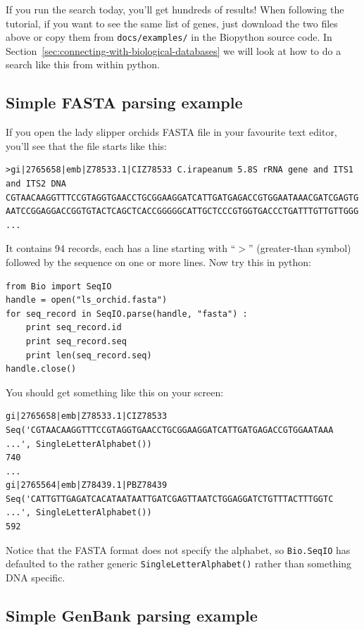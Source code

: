 \documentclass{report}
\begin{document}
If you run the search today, you'll get hundreds of results!  When following the tutorial, if you want to see the same list of genes, just download the two files above or copy them from \verb|docs/examples/| in the Biopython source code.  In Section~\ref{sec:connecting-with-biological-databases} we will look at how to do a search like this from within python.

\subsection{Simple FASTA parsing example}
\label{sec:fasta-parsing}

If you open the lady slipper orchids FASTA file in your favourite text editor, you'll see that the file starts like this:

\begin{verbatim}
>gi|2765658|emb|Z78533.1|CIZ78533 C.irapeanum 5.8S rRNA gene and ITS1 and ITS2 DNA
CGTAACAAGGTTTCCGTAGGTGAACCTGCGGAAGGATCATTGATGAGACCGTGGAATAAACGATCGAGTG
AATCCGGAGGACCGGTGTACTCAGCTCACCGGGGGCATTGCTCCCGTGGTGACCCTGATTTGTTGTTGGG
...
\end{verbatim}

It contains 94 records, each has a line starting with ``$>$'' (greater-than symbol) followed by the sequence on one or more lines.  Now try this in python:

\begin{verbatim}
from Bio import SeqIO
handle = open("ls_orchid.fasta")
for seq_record in SeqIO.parse(handle, "fasta") :
    print seq_record.id
    print seq_record.seq
    print len(seq_record.seq)
handle.close()
\end{verbatim}

\noindent You should get something like this on your screen:

\begin{verbatim}
gi|2765658|emb|Z78533.1|CIZ78533
Seq('CGTAACAAGGTTTCCGTAGGTGAACCTGCGGAAGGATCATTGATGAGACCGTGGAATAAA ...', SingleLetterAlphabet())
740
...
gi|2765564|emb|Z78439.1|PBZ78439
Seq('CATTGTTGAGATCACATAATAATTGATCGAGTTAATCTGGAGGATCTGTTTACTTTGGTC ...', SingleLetterAlphabet())
592
\end{verbatim}

Notice that the FASTA format does not specify the alphabet, so \verb|Bio.SeqIO| has defaulted to the rather generic \verb|SingleLetterAlphabet()| rather than something DNA specific.

\subsection{Simple GenBank parsing example}
\end{document}
